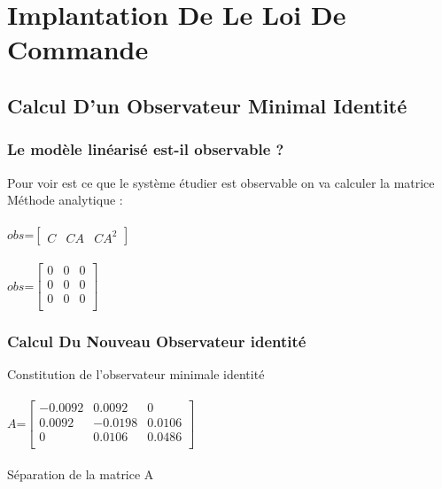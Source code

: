 \chapter{Implantation De Le Loi De Commande}
      
       
 
 
 \section{Calcul D’un Observateur Minimal Identité}

 \subsection{Le modèle linéarisé est-il observable ?}
 
 Pour voir est ce que le système étudier est observable   on va calculer la matrice \\
 Méthode analytique :\\\\
      $obs$=$\begin{bmatrix}
      C & CA & CA^{2}
      \end{bmatrix}$\\\\
      
      $obs$=$\begin{bmatrix}
      0 & 0 & 0 \\
      0 & 0 & 0 \\
      0 & 0 & 0 \\
      \end{bmatrix}$
 
 
 \subsection{Calcul Du Nouveau Observateur identité }
Constitution de l'observateur minimale identité\\\\
$A$=$\begin{bmatrix}
-0.0092 & 0.0092 & 0 \\
0.0092 & -0.0198 & 0.0106\\
0 & 0.0106 & 0.0486\\
\end{bmatrix}$\\\\
Séparation de la matrice A 

